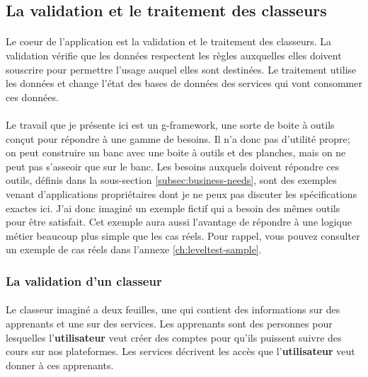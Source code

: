 \subsection{La validation et le traitement des classeurs}
\label{subsec:spreadsheet-use-case}

\paragraph{}
Le coeur de l'application est la validation et le traitement des classeurs.
La validation vérifie que les données respectent les règles auxquelles elles doivent souscrire pour permettre l'usage auquel elles sont destinées.
Le traitement utilise les données et change l'état des bases de données des services qui vont consommer ces données.

\paragraph{}
Le travail que je présente ici est un \gls{g-framework}, une sorte de boite à outils conçut pour répondre à une gamme de besoins.
Il n'a donc pas d'utilité propre; on peut construire un banc avec une boite à outils et des planches, mais on ne peut pas s'asseoir que sur le banc.
Les besoins auxquels doivent répondre ces outils, définis dans la sous-section \ref{subsec:business-needs}, sont des exemples venant d'applications propriétaires dont je ne peux pas discuter les spécifications exactes ici.
J'ai donc imaginé un exemple fictif qui a besoin des mêmes outils pour être satisfait.
Cet exemple aura aussi l'avantage de répondre à une logique métier beaucoup plus simple que les cas réels.
Pour rappel, vous pouvez consulter un exemple de cas réels dans l'annexe \ref{ch:leveltest-sample}.

\subsubsection{La validation d'un classeur}
\label{subsubsec:spreadsheet-validation-case}

\paragraph{}
Le classeur imaginé a deux feuilles, une qui contient des informations sur des apprenants et une sur des services.
Les apprenants sont des personnes pour lesquelles l'\textbf{utilisateur} veut créer des comptes pour qu'ils puissent suivre des cours sur nos plateformes.
Les services décrivent les accès que l'\textbf{utilisateur} veut donner à ces apprenants.


